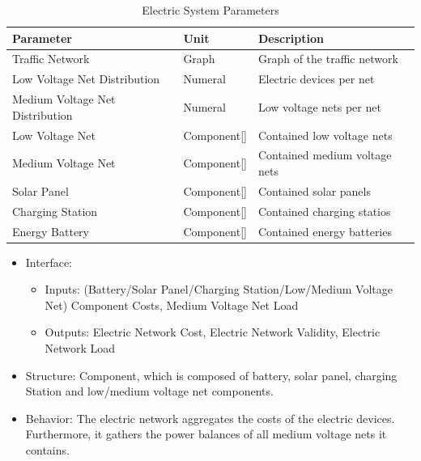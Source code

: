 	 \begin{table}[h]
	 	\renewcommand{\arraystretch}{1.3}
	 	\caption{Electric System Parameters}
	 	\centering
	 	\begin{tabular}{lll}
	 		\hline
	 		\textbf{Parameter}                    & \textbf{Unit} & \textbf{Description} \\ \hline
	 		Traffic Network                  	  & Graph          & Graph of the traffic network      \\
	 		Low Voltage Net Distribution                          & Numeral    & Electric devices per net      \\ 
	 		Medium Voltage Net Distribution                          & Numeral    & Low voltage nets per net      \\ 
	 		Low Voltage Net                          & Component[]    & Contained low voltage nets      \\ 
	 		Medium Voltage Net                        & Component[]    & Contained medium voltage nets      \\ 
	 		Solar Panel                       & Component[]    & Contained solar panels      \\ 
	 		Charging Station                          & Component[]    & Contained charging statios      \\ 
	 		Energy Battery                        & Component[]    & Contained energy batteries      \\ \hline
	 	\end{tabular}
	 \end{table}
	 
\begin{itemize}
	\item Interface: 
		\begin{itemize}
			\item Inputs: (Battery/Solar Panel/Charging Station/Low/Medium Voltage Net) Component Costs, Medium Voltage Net Load
			\item Outputs: Electric Network Cost, Electric Network Validity, Electric Network Load
		\end{itemize}	
	\item Structure: Component, which is composed of battery, solar panel, charging Station and low/medium voltage net components.
	\item Behavior: The electric network aggregates the costs of the electric devices. Furthermore, it gathers the power balances of all medium voltage nets it contains.
\end{itemize}

